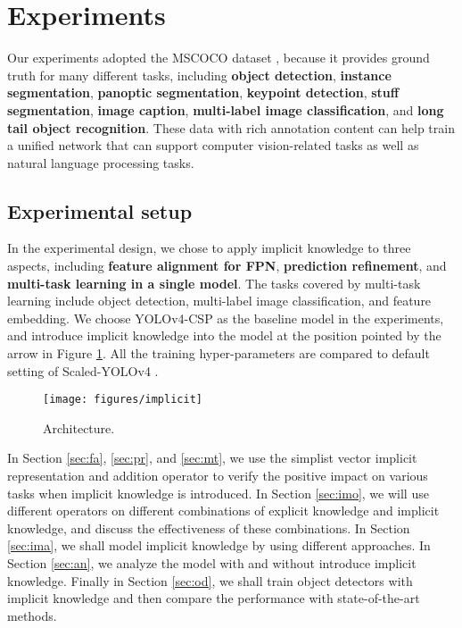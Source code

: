 \documentclass[10pt,twocolumn,letterpaper]{article}
\begin{document}
 
 
 
 
 \newpage

\section{Experiments}

Our experiments adopted the MSCOCO dataset \cite{lin2014microsoft}, because it provides ground truth for many different tasks, including \textbf{object detection}, \textbf{instance segmentation}, \textbf{panoptic segmentation}, \textbf{keypoint detection}, \textbf{stuff segmentation}, \textbf{image caption}, \textbf{multi-label image classification}, and \textbf{long tail object recognition}. These data with rich annotation content can help train a unified network that can support computer vision-related tasks as well as natural language processing tasks.

\subsection{Experimental setup}

In the experimental design, we chose to apply implicit knowledge to three aspects, including \textbf{feature alignment for FPN}, \textbf{prediction refinement}, and \textbf{multi-task learning in a single model}. The tasks covered by multi-task learning include object detection, multi-label image classification, and feature embedding. We choose YOLOv4-CSP \cite{wang2020scaled} as the baseline model in the experiments, and introduce implicit knowledge into the model at the position pointed by the arrow in Figure \ref{fig:imp}. All the training hyper-parameters are compared to default setting of Scaled-YOLOv4 \cite{wang2020scaled}.

\begin{figure}[h]
	\begin{center}
		\texttt{[image: figures/implicit]}
	\end{center}
	\caption{Architecture.}
	\label{fig:imp}
\end{figure}

In Section \ref{sec:fa}, \ref{sec:pr}, and \ref{sec:mt}, we use the simplist vector implicit representation and addition operator to verify the positive impact on various tasks when implicit knowledge is introduced. In Section \ref{sec:imo}, we will use different operators on different combinations of explicit knowledge and implicit knowledge, and discuss the effectiveness of these combinations. In Section \ref{sec:ima}, we shall model implicit knowledge by using different approaches. In Section \ref{sec:an}, we analyze the model with and without introduce implicit knowledge. Finally in Section \ref{sec:od}, we shall train object detectors with implicit knowledge and then compare the performance with state-of-the-art methods.
\end{document}
